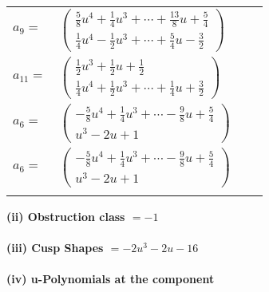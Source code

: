\documentclass[1p]{elsarticle_modified}
\theoremstyle{definition}
\begin{document}
\begin{tabular}{m{7pt} m{180pt} m{7pt} m{180pt} }
\flushright $a_{9}=$&$\begin{pmatrix}\frac{5}{8} u^4+\frac{1}{4} u^3+\cdots+\frac{13}{8} u+\frac{5}{4}\\\frac{1}{4} u^4-\frac{1}{2} u^3+\cdots+\frac{5}{4} u-\frac{3}{2}\end{pmatrix}$ \\
\flushright $a_{11}=$&$\begin{pmatrix}\frac{1}{2} u^3+\frac{1}{2} u+\frac{1}{2}\\\frac{1}{4} u^4+\frac{1}{2} u^3+\cdots+\frac{1}{4} u+\frac{3}{2}\end{pmatrix}$ \\
\flushright $a_{6}=$&$\begin{pmatrix}-\frac{5}{8} u^4+\frac{1}{4} u^3+\cdots-\frac{9}{8} u+\frac{5}{4}\\u^3-2 u+1\end{pmatrix}$\\ \flushright $a_{6}=$&$\begin{pmatrix}-\frac{5}{8} u^4+\frac{1}{4} u^3+\cdots-\frac{9}{8} u+\frac{5}{4}\\u^3-2 u+1\end{pmatrix}$\\&\end{tabular}
\flushleft \textbf{(ii) Obstruction class $= -1$}\\~\\
\flushleft \textbf{(iii) Cusp Shapes $= -2 u^3-2 u-16$}\\~\\
\newpage\renewcommand{\arraystretch}{1}
\flushleft \textbf{(iv) u-Polynomials at the component}\newline \\
\end{document}
